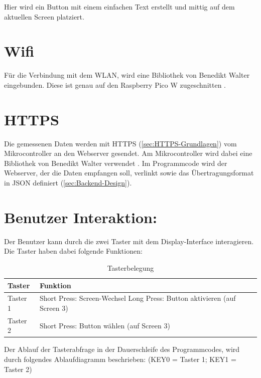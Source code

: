 \begin{inhalt}
Hier wird ein Button mit einem einfachen Text erstellt und mittig auf dem aktuellen Screen platziert.

\section{Wifi}

Für die Verbindung mit dem WLAN, wird eine Bibliothek von Benedikt Walter eingebunden. Diese ist genau auf den Raspberry Pico W zugeschnitten \cite{Erasmus-Code-Github}. 

\section{HTTPS}

Die gemessenen Daten werden mit HTTPS (\ref{sec:HTTPS-Grundlagen}) vom Mikrocontroller an den Webserver gesendet. Am Mikrocontroller wird dabei eine Bibliothek von Benedikt Walter verwendet \cite{Erasmus-Code-Github}. Im Programmcode wird der Webserver, der die Daten empfangen soll, verlinkt sowie das Übertragungsformat in JSON definiert (\ref{sec:Backend-Design}).



\section{Benutzer Interaktion:} \label{sec:BeutzerInteraktionen}

Der Benutzer kann durch die zwei Taster mit dem Display-Interface interagieren. Die Taster haben dabei folgende Funktionen:

\begin{table}[H]
\centering
\renewcommand{\arraystretch}{1.3}
\begin{tabular}{|l|p{10cm}|}
\hline
\rowcolor{cyan!20}
\textbf{Taster} & \textbf{Funktion} \\
\hline
Taster 1 & 
Short Press: Screen-Wechsel \newline
Long Press: Button aktivieren (auf Screen 3) \\
\hline
Taster 2 & 
Short Press: Button wählen (auf Screen 3) \\
\hline
\end{tabular}
\caption{Tasterbelegung}
\label{tab:Taster-Funktionen}
\end{table}


Der Ablauf der Tasterabfrage in der Dauerschleife des Programmcodes, wird durch folgendes Ablaufdiagramm beschrieben: (KEY0 = Taster 1; KEY1 = Taster 2)


\end{inhalt}
